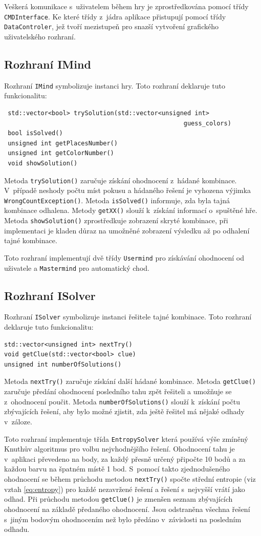 \documentclass[12pt, a4paper]{article}
\begin{document}
Veškerá komunikace s~uživatelem během hry je zprostředkována pomocí třídy \texttt{CMDInterface}. Ke které třídy z~jádra aplikace přistupují pomocí třídy \texttt{DataControler}, jež tvoří mezistupeň pro snazší vytvoření grafického uživatelského rozhraní.

\subsection{Rozhraní IMind}
Rozhraní \texttt{IMind} symbolizuje instanci hry. Toto rozhraní deklaruje tuto funkcionalitu:
\begin{verbatim}
 std::vector<bool> trySolution(std::vector<unsigned int> 
                                                 guess_colors)
 bool isSolved()
 unsigned int getPlacesNumber()
 unsigned int getColorNumber()
 void showSolution()
\end{verbatim}
Metoda \texttt{trySolution()} zaručuje získání ohodnocení z~hádané kombinace. V~případě neshody počtu míst pokusu a hádaného řešení je vyhozena výjimka \texttt{WrongCountException()}. Metoda \texttt{isSolved()} informuje, zda byla tajná kombinace odhalena. Metody \texttt{getXX()} slouží k~získání informací o~spuštěné hře. Metoda \texttt{showSolution()} zprostředkuje zobrazení skryté kombinace, při implementaci je kladen důraz na umožněné zobrazení výsledku až po odhalení tajné kombinace.

Toto rozhraní implementují dvě třídy \texttt{Usermind} pro získávání ohodnocení od uživatele a \texttt{Mastermind} pro automatický chod. 

\subsection{Rozhraní ISolver}
Rozhraní \texttt{ISolver} symbolizuje instanci řešitele tajné kombinace. Toto rozhraní deklaruje tuto funkcionalitu:
\begin{verbatim}
std::vector<unsigned int> nextTry()
void getClue(std::vector<bool> clue)
unsigned int numberOfSolutions()
\end{verbatim}

Metoda \texttt{nextTry()} zaručuje získání další hádané kombinace. Metoda \texttt{getClue()} zaručuje předání ohodnocení posledního tahu zpět řešiteli a umožňuje se z~ohodnocení poučit. Metoda \texttt{numberOfSolutions()} slouží k~získání počtu zbývajících řešení, aby bylo možné zjistit, zda ještě řešitel má nějaké odhady v~záloze.

Toto rozhraní implementuje třída \texttt{EntropySolver} která používá výše zmíněný Knuthův algoritmus pro volbu nejvhodnějšího řešení. Ohodnocení tahu je v~aplikaci převedeno na body, za každý přesně určený připočte 10 bodů a za každou barvu na špatném místě 1 bod. S~pomocí takto zjednodušeného ohodnocení se během průchodu metodou \texttt{nextTry()} spočte střední entropie (viz vztah \ref{eq:entropy}) pro každé nezavržené řešení a řešení s~nejvyšší vrátí jako odhad. Při průchodu metodou \texttt{getClue()} je zmenšen seznam zbývajících ohodnocení na základě předaného ohodnocení. Jsou odstraněna všechna řešení s~jiným bodovým ohodnocením než bylo předáno v~závislosti na posledním odhadu.
\end{document}
